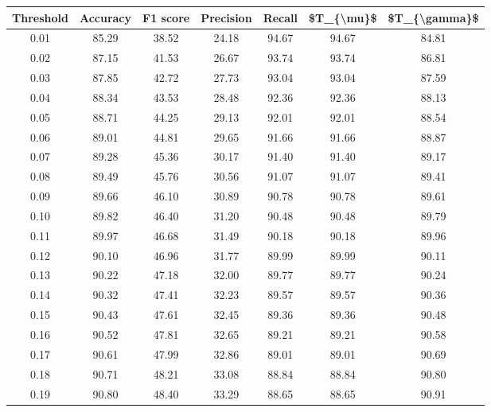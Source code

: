 \begin{tabular}{|c|c|c|c|c|c|c|}
\hline
 Threshold &  Accuracy &  F1 score &  Precision &  Recall &  \$T\_\{\textbackslash mu\}\$ &  \$T\_\{\textbackslash gamma\}\$ \\
\hline
      0.01 &     85.29 &     38.52 &      24.18 &   94.67 &      94.67 &         84.81 \\
      0.02 &     87.15 &     41.53 &      26.67 &   93.74 &      93.74 &         86.81 \\
      0.03 &     87.85 &     42.72 &      27.73 &   93.04 &      93.04 &         87.59 \\
      0.04 &     88.34 &     43.53 &      28.48 &   92.36 &      92.36 &         88.13 \\
      0.05 &     88.71 &     44.25 &      29.13 &   92.01 &      92.01 &         88.54 \\
      0.06 &     89.01 &     44.81 &      29.65 &   91.66 &      91.66 &         88.87 \\
      0.07 &     89.28 &     45.36 &      30.17 &   91.40 &      91.40 &         89.17 \\
      0.08 &     89.49 &     45.76 &      30.56 &   91.07 &      91.07 &         89.41 \\
      0.09 &     89.66 &     46.10 &      30.89 &   90.78 &      90.78 &         89.61 \\
      0.10 &     89.82 &     46.40 &      31.20 &   90.48 &      90.48 &         89.79 \\
      0.11 &     89.97 &     46.68 &      31.49 &   90.18 &      90.18 &         89.96 \\
      0.12 &     90.10 &     46.96 &      31.77 &   89.99 &      89.99 &         90.11 \\
      0.13 &     90.22 &     47.18 &      32.00 &   89.77 &      89.77 &         90.24 \\
      0.14 &     90.32 &     47.41 &      32.23 &   89.57 &      89.57 &         90.36 \\
      0.15 &     90.43 &     47.61 &      32.45 &   89.36 &      89.36 &         90.48 \\
      0.16 &     90.52 &     47.81 &      32.65 &   89.21 &      89.21 &         90.58 \\
      0.17 &     90.61 &     47.99 &      32.86 &   89.01 &      89.01 &         90.69 \\
      0.18 &     90.71 &     48.21 &      33.08 &   88.84 &      88.84 &         90.80 \\
      0.19 &     90.80 &     48.40 &      33.29 &   88.65 &      88.65 &         90.91 \\

\end{tabular}
